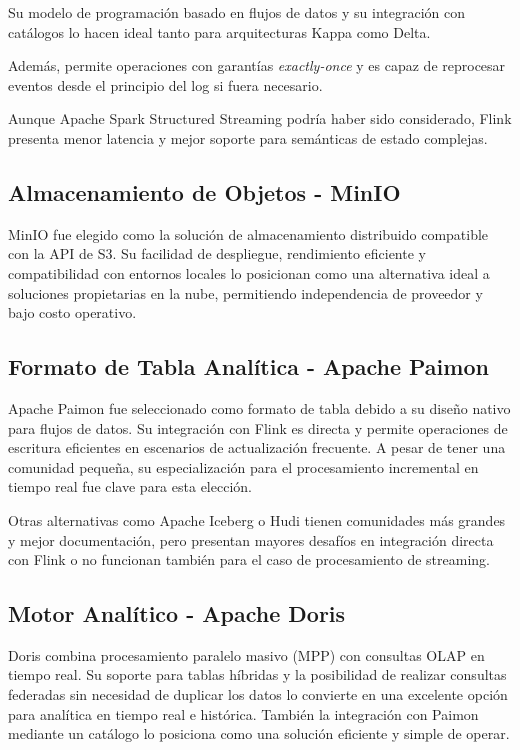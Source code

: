 Su modelo de programación basado en flujos de datos y su integración con catálogos lo hacen ideal tanto para arquitecturas Kappa como Delta.\newline 

Además, permite operaciones con garantías \textit{exactly-once} y es capaz de reprocesar eventos desde el principio del log si fuera necesario.\newline

Aunque Apache Spark Structured Streaming podría haber sido considerado, 
Flink presenta menor latencia y mejor soporte para semánticas de estado complejas.

\subsection*{Almacenamiento de Objetos - MinIO}

MinIO fue elegido como la solución de almacenamiento distribuido compatible con la API de S3. 
Su facilidad de despliegue, rendimiento eficiente y compatibilidad con entornos locales lo posicionan como una alternativa ideal a soluciones propietarias en la nube, 
permitiendo independencia de proveedor y bajo costo operativo.

\subsection*{Formato de Tabla Analítica - Apache Paimon}

Apache Paimon fue seleccionado como formato de tabla debido a su diseño nativo para flujos de datos. 
Su integración con Flink es directa y permite operaciones de escritura eficientes en escenarios de actualización frecuente. 
A pesar de tener una comunidad pequeña, 
su especialización para el procesamiento incremental en tiempo real fue clave para esta elección.\newline

Otras alternativas como Apache Iceberg o Hudi tienen comunidades más grandes y mejor documentación, 
pero presentan mayores desafíos en integración directa con Flink 
o no funcionan también para el caso de procesamiento de streaming.

\newpage

\subsection*{Motor Analítico - Apache Doris}

Doris combina procesamiento paralelo masivo (MPP) con consultas OLAP en tiempo real. 
Su soporte para tablas híbridas y la posibilidad de realizar consultas federadas sin necesidad de duplicar los datos lo convierte en una excelente opción para analítica en tiempo real e histórica.
También la integración con Paimon mediante un catálogo lo posiciona como una solución eficiente y simple de operar.\newline

